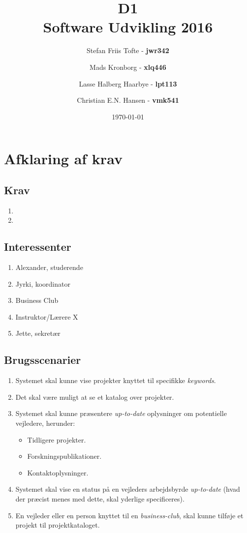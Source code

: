 \documentclass[11pt]{article}
\title{
  \vspace{3cm}
  \Huge{D1} \\
  \Large{Software Udvikling 2016}
}
\author{
	\Large{Stefan Friis Tofte} - \textbf{jwr342}%
	\and
	\Large{Mads Kronborg} - \textbf{xlq446}%
	\and
	\Large{Lasse Halberg Haarbye} - \textbf{lpt113}%
	\and
	\Large{Christian E.N. Hansen} - \textbf{vmk541}%
}
\date{
    \today
}
\def \ColourPDF {../include/ku-farve}
\def \TitlePDF {../include/ku-en}  %
\begin{document}


\clearpage\maketitle
\thispagestyle{empty}

\newpage
\tableofcontents
\newpage
\section{Afklaring af krav}
\subsection{Krav}
\begin{enumerate}
\item
\item
\end{enumerate}
\subsection{Interessenter}
\begin{enumerate}
\item Alexander, studerende
\item Jyrki, koordinator
\item Business Club
\item Instruktor/Lærere X
\item Jette, sekretær
\end{enumerate}
\subsection{Brugsscenarier}

\begin{enumerate}
  \item Systemet skal kunne vise projekter knyttet til specifikke \textit{keywords}.
  \item Det skal være muligt at se et katalog over projekter.
  \item Systemet skal kunne præsentere \textit{up-to-date} oplysninger om potentielle vejledere, herunder:
  \begin{itemize}
    \item Tidligere projekter.
    \item Forskningspublikationer.
    \item Kontaktoplysninger.
  \end{itemize}
  \item Systemet skal vise en status på en vejleders arbejdsbyrde \textit{up-to-date} (hvad der præcist menes med dette, skal yderlige specificeres).
  \item En vejleder eller en person knyttet til en \textit{business-club}, skal kunne tilføje et projekt til projektkataloget.
\end{enumerate}
\end{document}
